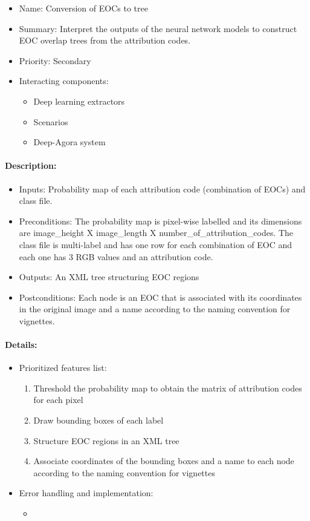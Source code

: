 \documentclass{polytech/polytech}
\numberwithin{figure}{chapter}
\begin{document}
\begin{appendix}
\begin{itemize}
    \item Name: Conversion of EOCs to tree
    \item Summary: Interpret the outputs of the neural network models to construct EOC overlap trees from the attribution codes.
    \item Priority: Secondary
    \item Interacting components:
    \begin{itemize}
        \item Deep learning  extractors
        \item Scenarios
        \item Deep-Agora system
    \end{itemize}
\end{itemize}

\paragraph{Description:}
 
\begin{itemize}
    \item Inputs: Probability map of each attribution code (combination of EOCs) and class file.
    \item Preconditions: The probability map is pixel-wise labelled and its dimensions are image_height X image_length X number_of_attribution_codes.
The class file is multi-label and has one row for each combination of EOC and each one has 3 RGB values and an attribution code.
    \item Outputs: An XML tree structuring EOC regions
    \item Postconditions: Each node is an EOC that is associated with its coordinates in the original image and a name according to the naming convention for vignettes.
\end{itemize}

\paragraph{Details:}

\begin{itemize}
    \item Prioritized features list: 
    \begin{enumerate}
        \item	Threshold the probability map to obtain the matrix of attribution codes for each pixel
        \item	Draw bounding boxes of each label
        \item	Structure EOC regions in an XML tree
        \item	Associate coordinates of the bounding boxes and a name to each node according to the naming convention for vignettes
    \end{enumerate}
    \item Error handling and implementation: 
    \begin{itemize}
        \item	
    \end{itemize}
\end{itemize}



\end{appendix}
\end{document}

